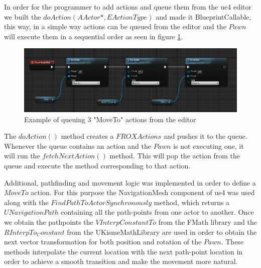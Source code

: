 In order for the programmer to add actions and queue them from the \gls{ue4} editor we built the $doAction(AActor*, EActionType)$ and made it BlueprintCallable, this way, in a simple way actions can be queued from the editor and the $Pawn$ will execute them in a sequential order as seen in figure \ref{action_queue}.

\begin{figure}[h]
	\includegraphics[scale=0.4]{archivos/action_queue.png}
	\centering
	\caption{Example of queuing 3 "MoveTo" actions from the editor}
	\label{action_queue}
\end{figure}

The $doAction()$ method creates a $FROXActions$ and pushes it to the queue. Whenever the queue contains an action and the $Pawn$ is not executing one, it will run the $fetchNextAction()$ method. This will pop the action from the queue and execute the method corresponding to that action.


Additional, pathfinding and movement logic was implemented in order to define a $MoveTo$ action. For this purpose the NavigationMesh component of \gls{ue4} was used along with the $FindPathToActorSynchronously$ method, which returns a $UNavigationPath$ containing all the path-points from one actor to another. Once we obtain the pathpoints the $VInterpConstantTo$ from the FMath library and the $RInterpTo_Constant$ from the UKismeMathLibrary are used in order to obtain the next vector transformation for both position and rotation of the $Pawn$. These methods interpolate the current location with the next path-point location in order to achieve a smooth transition and make the movement more natural.